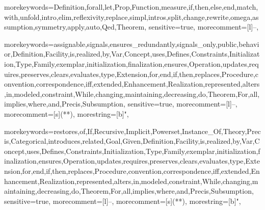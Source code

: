\usepackage{listings}
\usepackage{amsthm}
\usepackage{amsfonts}
\usepackage{amssymb}
\usepackage{amsmath}
\usepackage{caption}
\usepackage{subcaption}
\usepackage{mathrsfs}
\usepackage{booktabs}
\usepackage{placeins}

\setcounter{secnumdepth}{3}

\newtheorem{thm}{Theorem}


	{
		morekeywords={Definition,forall,let,Prop,Function,measure,if,then,else,end,match,with,unfold,intro,elim,reflexivity,replace,simpl,intros,split,change,rewrite,omega,assumption,symmetry,apply,auto,Qed,Theorem},
		sensitive=true,
		morecomment=[l]{--},
	}

	{
		morekeywords={assignable,signals,ensures_redundantly,signals_only,public,behavior,Definition,Facility,is,realized,by,Var,Concept,uses,Defines,Constraints,Initialization,Type,Family,exemplar,initialization,finalization,ensures,Operation,updates,requires,preserves,clears,evaluates,type,Extension,for,end,if,then,replaces,Procedure,convention,correspondence,iff,extended,Enhancement,Realization,represented,alters,in,modeled,constraint,While,changing,maintaining,decreasing,do,Theorem,For,all,implies,where,and,Precis,Subsumption},
		sensitive=true,
		morecomment=[l]{--},
		morecomment=[s]{(*}{*)},
		morestring=[b]",
	}

	{
		morekeywords={restores,of,If,Recursive,Implicit,Powerset,Instance_Of,Theory,Precis,Categorical,introduces,related,Goal,Given,Definition,Facility,is,realized,by,Var,Concept,uses,Defines,Constraints,Initialization,Type,Family,exemplar,initialization,finalization,ensures,Operation,updates,requires,preserves,clears,evaluates,type,Extension,for,end,if,then,replaces,Procedure,convention,correspondence,iff,extended,Enhancement,Realization,represented,alters,in,modeled,constraint,While,changing,maintaining,decreasing,do,Theorem,For,all,implies,where,and,Precis,Subsumption},
		sensitive=true,
		morecomment=[l]{--},
		morecomment=[s]{(*}{*)},
		morestring=[b]",
	}
\lstset{language=resolve}

\usepackage{graphicx}

\newcommand{\cplusplus}{{\rm C\raise.5ex\hbox{\small ++}}}
